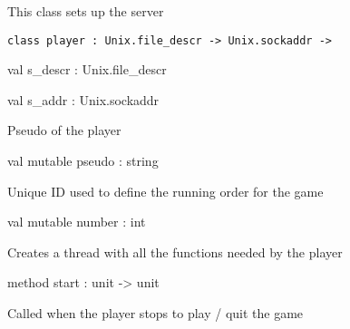 \documentclass[11pt]{article}
\begin{document}
\begin{ocamldocdescription}
This class sets up the server


\end{ocamldocdescription}




\begin{ocamldoccode}
{\tt{class player : }}{\tt{Unix.file\_descr -> Unix.sockaddr -> }}\end{ocamldoccode}
\label{class:Server2.player}

\begin{ocamldocobjectend}


\label{val:Server2.player.s-underscoredescr}\begin{ocamldoccode}
val s_descr : Unix.file_descr
\end{ocamldoccode}


\label{val:Server2.player.s-underscoreaddr}\begin{ocamldoccode}
val s_addr : Unix.sockaddr
\end{ocamldoccode}
\begin{ocamldocdescription}
Pseudo of the player


\end{ocamldocdescription}


\label{val:Server2.player.pseudo}\begin{ocamldoccode}
val mutable pseudo : string
\end{ocamldoccode}
\begin{ocamldocdescription}
Unique ID used to define the running order for the game


\end{ocamldocdescription}


\label{val:Server2.player.number}\begin{ocamldoccode}
val mutable number : int
\end{ocamldoccode}
\begin{ocamldocdescription}
Creates a thread with all the functions needed by the player


\end{ocamldocdescription}


\label{method:Server2.player.start}\begin{ocamldoccode}
method start : unit -> unit
\end{ocamldoccode}
\begin{ocamldocdescription}
Called when the player stops to play / quit the game



\end{ocamldocdescription}
\end{ocamldocobjectend}
\end{document}
